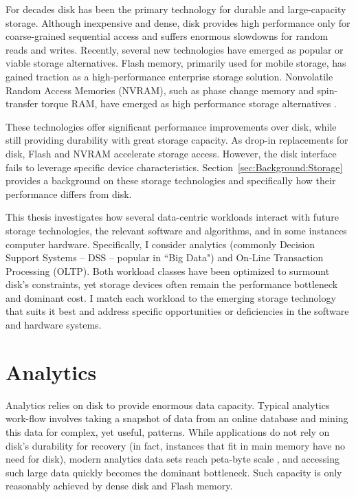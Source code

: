 For decades disk has been the primary technology for durable and large-capacity storage.
Although inexpensive and dense, disk provides high performance only for coarse-grained sequential access and suffers enormous slowdowns for random reads and writes.
Recently, several new technologies have emerged as popular or viable storage alternatives.
Flash memory, primarily used for mobile storage, has gained traction as a high-performance enterprise storage solution.
Nonvolatile Random Access Memories (NVRAM), such as phase change memory and spin-transfer torque RAM, have emerged as high performance storage alternatives \cite{BurrKurdi08}.

These technologies offer significant performance improvements over disk, while still providing durability with great storage capacity.
As drop-in replacements for disk, Flash and NVRAM accelerate storage access.
However, the disk interface fails to leverage specific device characteristics.
Section~\ref{sec:Background:Storage} provides a background on these storage technologies and specifically how their performance differs from disk.

This thesis investigates how several data-centric workloads interact with future storage technologies, the relevant software and algorithms, and in some instances computer hardware.
Specifically, I consider analytics (commonly Decision Support Systems -- DSS -- popular in ``Big Data") and On-Line Transaction Processing (OLTP).
Both workload classes have been optimized to surmount disk's constraints, yet storage devices often remain the performance bottleneck and dominant cost.
I match each workload to the emerging storage technology that suits it best and address specific opportunities or deficiencies in the software and hardware systems.

\section{Analytics}
\label{sec:Intro:Analytics}

Analytics relies on disk to provide enormous data capacity.
Typical analytics work-flow involves taking a snapshot of data from an online database and mining this data for complex, yet useful, patterns.
While applications do not rely on disk's durability for recovery (in fact, instances that fit in main memory have no need for disk), modern analytics data sets reach peta-byte scale \cite{Economist10}, and accessing such large data quickly becomes the dominant bottleneck.
Such capacity is only reasonably achieved by dense disk and Flash memory.

